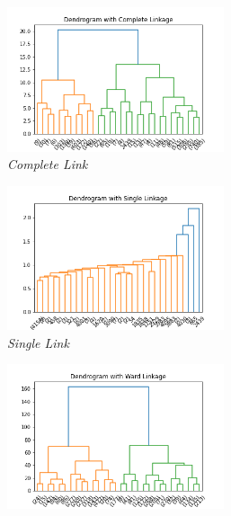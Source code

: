 \begin{figure}[h!]
    \centering
	\vspace*{-0.3cm}
    \begin{subfigure}{0.49\textwidth}
        \centering
        \includegraphics[width=0.7\textwidth]{img/clustering/complete_link.png}
        \caption{\emph{Complete Link}}
        \label{fig:complete_link}
    \end{subfigure}
    \begin{subfigure}{0.49\textwidth}
        \centering
        \includegraphics[width=0.7\textwidth]{img/clustering/single_link.png}
        \caption{\emph{Single Link}}
        \label{fig:single_link}
    \end{subfigure}
    \begin{subfigure}{0.49\textwidth}
        \centering
        \includegraphics[width=0.7\textwidth]{img/clustering/ward_link.png}

\end{subfigure}
\end{figure}

